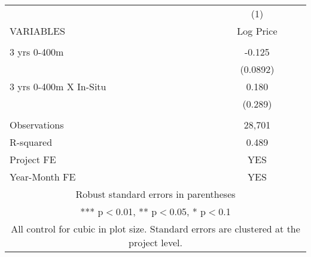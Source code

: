 \begin{tabular}{lc} \hline
 & (1) \\
VARIABLES & Log Price \\ \hline
 &  \\
3 yrs 0-400m & -0.125 \\
 & (0.0892) \\
3 yrs 0-400m X In-Situ & 0.180 \\
 & (0.289) \\
 &  \\
Observations & 28,701 \\
R-squared & 0.489 \\
Project FE & YES \\
 Year-Month FE & YES \\ \hline
\multicolumn{2}{c}{ Robust standard errors in parentheses} \\
\multicolumn{2}{c}{ *** p$<$0.01, ** p$<$0.05, * p$<$0.1} \\
\multicolumn{2}{c}{ All control for cubic in plot size. Standard errors are clustered at the project level.} \\
\end{tabular}
